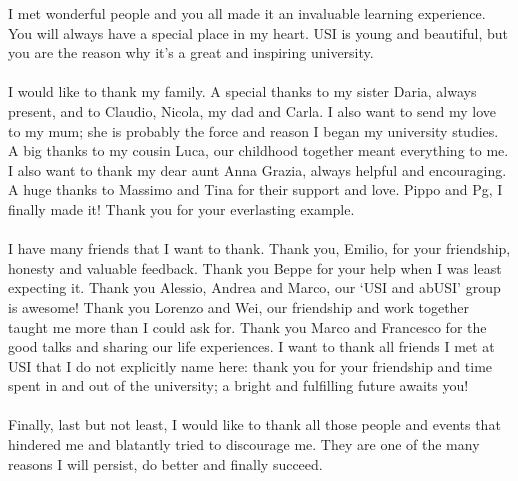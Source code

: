 \documentclass[11pt, mscthesis]{usiinfthesis}
\begin{document}
\begin{acknowledgements}
I met wonderful people and you all made it an invaluable learning experience. You will always have a special place in my heart. USI is young and beautiful, but you are the reason why it’s a great and inspiring university.
\\
\\
I would like to thank my family. A special thanks to my sister Daria, always present, and to Claudio, Nicola, my dad and Carla. I also want to send my love to my mum; she is probably the force and reason I began my university studies. A big thanks to my cousin Luca, our childhood together meant everything to me. I also want to thank my dear aunt Anna Grazia, always helpful and encouraging. A huge thanks to Massimo and Tina for their support and love. Pippo and Pg, I finally made it! Thank you for your everlasting example. 
\\
\\
I have many friends that I want to thank. Thank you, Emilio, for your friendship, honesty and valuable feedback. Thank you Beppe for your help when I was least expecting it. Thank you Alessio, Andrea and Marco, our `USI and abUSI' group is awesome! Thank you Lorenzo and Wei, our friendship and work together taught me more than I could ask for. Thank you Marco and Francesco for the good talks and sharing our life experiences.  I want to thank all friends I met at USI that I do not explicitly name here: thank you for your friendship and time spent in and out of the university; a bright and fulfilling future awaits you!
\\
\\
Finally, last but not least, I would like to thank all those people and events that hindered me and blatantly tried to discourage me. They are one of the many reasons I will persist, do better and finally succeed.


\end{acknowledgements}

\tableofcontents 
\listoffigures %
\listoftables %

\mainmatter










\appendix


\end{document}
